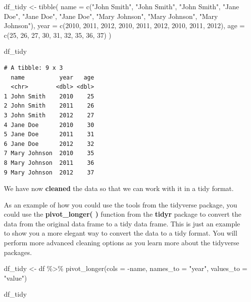 \documentclass[
  letterpaper,
  DIV=11,
  numbers=noendperiod]{scrreprt}
\newenvironment{Shaded}{\begin{snugshade}}{\end{snugshade}}
\newcommand{\AttributeTok}[1]{\textcolor[rgb]{0.40,0.45,0.13}{#1}}
\newcommand{\DecValTok}[1]{\textcolor[rgb]{0.68,0.00,0.00}{#1}}
\newcommand{\FunctionTok}[1]{\textcolor[rgb]{0.28,0.35,0.67}{#1}}
\newcommand{\NormalTok}[1]{\textcolor[rgb]{0.00,0.23,0.31}{#1}}
\newcommand{\OtherTok}[1]{\textcolor[rgb]{0.00,0.23,0.31}{#1}}
\newcommand{\SpecialCharTok}[1]{\textcolor[rgb]{0.37,0.37,0.37}{#1}}
\newcommand{\StringTok}[1]{\textcolor[rgb]{0.13,0.47,0.30}{#1}}
\begin{document}
\begin{Shaded}
\begin{Highlighting}[]
\NormalTok{df\_tidy }\OtherTok{\textless{}{-}} \FunctionTok{tibble}\NormalTok{(}
  \AttributeTok{name =} \FunctionTok{c}\NormalTok{(}\StringTok{"John Smith"}\NormalTok{, }\StringTok{"John Smith"}\NormalTok{, }\StringTok{"John Smith"}\NormalTok{, }\StringTok{"Jane Doe"}\NormalTok{, }\StringTok{"Jane Doe"}\NormalTok{, }
           \StringTok{"Jane Doe"}\NormalTok{, }\StringTok{"Mary Johnson"}\NormalTok{, }\StringTok{"Mary Johnson"}\NormalTok{, }\StringTok{"Mary Johnson"}\NormalTok{),}
  \AttributeTok{year =} \FunctionTok{c}\NormalTok{(}\DecValTok{2010}\NormalTok{, }\DecValTok{2011}\NormalTok{, }\DecValTok{2012}\NormalTok{, }\DecValTok{2010}\NormalTok{, }\DecValTok{2011}\NormalTok{, }\DecValTok{2012}\NormalTok{, }\DecValTok{2010}\NormalTok{, }\DecValTok{2011}\NormalTok{, }\DecValTok{2012}\NormalTok{),}
  \AttributeTok{age =} \FunctionTok{c}\NormalTok{(}\DecValTok{25}\NormalTok{, }\DecValTok{26}\NormalTok{, }\DecValTok{27}\NormalTok{, }\DecValTok{30}\NormalTok{, }\DecValTok{31}\NormalTok{, }\DecValTok{32}\NormalTok{, }\DecValTok{35}\NormalTok{, }\DecValTok{36}\NormalTok{, }\DecValTok{37}\NormalTok{)}
\NormalTok{)}

\NormalTok{df\_tidy}
\end{Highlighting}
\end{Shaded}

\begin{verbatim}
# A tibble: 9 x 3
  name          year   age
  <chr>        <dbl> <dbl>
1 John Smith    2010    25
2 John Smith    2011    26
3 John Smith    2012    27
4 Jane Doe      2010    30
5 Jane Doe      2011    31
6 Jane Doe      2012    32
7 Mary Johnson  2010    35
8 Mary Johnson  2011    36
9 Mary Johnson  2012    37
\end{verbatim}

We have now \textbf{cleaned} the data so that we can work with it in a
tidy format.

As an example of how you could use the tools from the tidyverse package,
you could use the \textbf{pivot\_longer( )} function from the
\textbf{tidyr} package to convert the data from the original data frame
to a tidy data frame. This is just an example to show you a more elegant
way to convert the data to a tidy format. You will perform more advanced
cleaning options as you learn more about the tidyverse packages.

\begin{Shaded}
\begin{Highlighting}[]
\NormalTok{df\_tidy }\OtherTok{\textless{}{-}}\NormalTok{ df }\SpecialCharTok{\%\textgreater{}\%} 
  \FunctionTok{pivot\_longer}\NormalTok{(}\AttributeTok{cols =} \SpecialCharTok{{-}}\NormalTok{name, }\AttributeTok{names\_to =} \StringTok{"year"}\NormalTok{, }\AttributeTok{values\_to =} \StringTok{"value"}\NormalTok{)}

\NormalTok{df\_tidy}
\end{Highlighting}
\end{Shaded}
\end{document}
